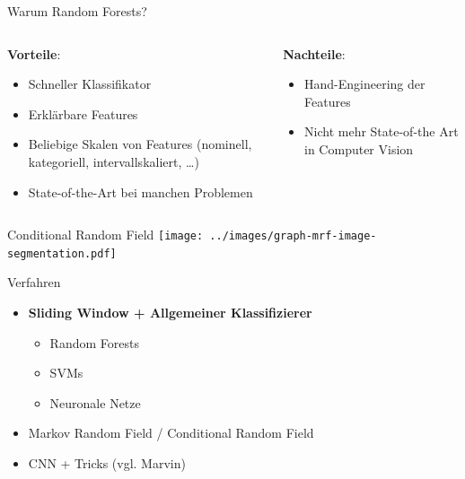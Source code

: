 \begin{frame}{Warum Random Forests?}
    \begin{columns}[t,onlytextwidth]
        \begin{column}{0.5\textwidth}
            \textbf{Vorteile}:
            \begin{itemize}
                \item Schneller Klassifikator
                \item Erklärbare Features
                \item Beliebige Skalen von Features (nominell, kategoriell, intervallskaliert, \dots)
                \item State-of-the-Art bei manchen Problemen
            \end{itemize}
        \end{column}
        \begin{column}{0.5\textwidth}
            \textbf{Nachteile}:
            \begin{itemize}
                \item Hand-Engineering der Features
                \item Nicht mehr State-of-the Art in Computer Vision
            \end{itemize}
        \end{column}
    \end{columns}
\end{frame}

\begin{frame}{Conditional Random Field}
    \texttt{[image: ../images/graph-mrf-image-segmentation.pdf]}
\end{frame}

\begin{frame}{Verfahren}
    \begin{itemize}
        \item \textbf{Sliding Window + Allgemeiner Klassifizierer}
        \begin{itemize}
            \item Random Forests
            \item SVMs
            \item Neuronale Netze
        \end{itemize}
        \item Markov Random Field / Conditional Random Field
        \item CNN + Tricks (vgl. Marvin)
    \end{itemize}
\end{frame}
